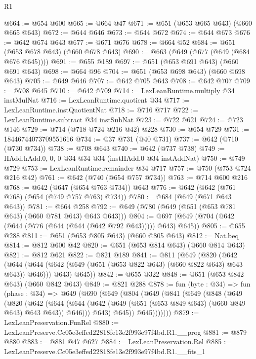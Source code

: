 \begin{lexlean}{R1}
\begin{coremodule}
@664 := @654 @600
@665 := @664 @47
@671 := @651 (@653 @665 @643) (@660 @665 @643)
@672 := @644 @646
@673 := @644 @672
@674 := @644 @673
@676 := @642 @674 @643
@677 := @671 @676
@678 := @664 @52
@684 := @651 (@653 @678 @643) (@660 @678 @643)
@690 := @663 (@649 (@677 (@649 (@684 @676 @645))))
@691 := @655 @189
@697 := @651 (@653 @691 @643) (@660 @691 @643)
@698 := @664 @96
@704 := @651 (@653 @698 @643) (@660 @698 @643)
@705 := @649 @646
@707 := @642 @705 @643
@708 := @642 @707
@709 := @708 @645
@710 := @642 @709
@714 := LexLeanRuntime.multiply @34 instMulNat
@716 := LexLeanRuntime.quotient @34
@717 := LexLeanRuntime.instQuotientNat
@718 := @716 @717
@722 := LexLeanRuntime.subtract @34 instSubNat
@723 := @722 @621
@724 := @723 @146
@729 := @714 (@718 @724 @216 @42) @228
@730 := @654 @729
@731 := 18446744073709551616
@734 := @37 @731 (@40 @731)
@737 := @642 (@710 (@730 @734))
@738 := @708 @643
@740 := @642 (@737 @738)
@749 := HAdd.hAdd.{0, 0, 0} @34 @34 @34 (instHAdd.{0} @34 instAddNat)
@750 := @749 @729
@753 := LexLeanRuntime.remainder @34 @717
@757 := @750 (@753 @724 @216 @42)
@761 := @642 (@740 (@654 @757 @734))
@763 := @714 @600 @216
@768 := @642 (@647 (@654 @763 @734)) @643
@776 := @642 (@642 (@761 @768) (@654 (@749 @757 @763) @734))
@780 := @684 (@649 (@671 @643 @643))
@781 := @664 @258
@792 := @649 (@780 (@649 (@651 (@653 @781 @643) (@660 @781 @643) @643 @643)))
@804 := @697 (@649 (@704 (@642 (@644 (@776 (@644 (@644 (@642 @792 @643))))) @643) @645))
@805 := @655 @288
@811 := @651 (@653 @805 @643) (@660 @805 @643)
@812 := Nat.beq
@814 := @812 @600 @42
@820 := @651 (@653 @814 @643) (@660 @814 @643)
@821 := @812 @621
@822 := @821 @189
@841 := @811
    (@649
      (@820
        (@642
          (@644 (@644 (@642 (@649 (@651 (@653 @822 @643) (@660 @822 @643) @643 @643)) @646)))
          @643)
        @645))
@842 := @655 @322
@848 := @651 (@653 @842 @643) (@660 @842 @643)
@849 := @821 @288
@878 := fun (byte : @34) =>
  fun (phase : @34) =>
  @649
    (@690
      (@649
        (@804
          (@649
            (@841
              (@649
                (@848
                  (@649
                    (@820
                      (@642
                        (@644
                          (@644
                            (@642 (@649 (@651 (@653 @849 @643) (@660 @849 @643) @643 @643)) @646)))
                        @643)
                      @645))
                  @645)))))))
@879 := LexLeanPreservation.FunRel
@880 := LexLeanPreserve.Cc05e3effed22818fe13e2f993e97f4bd.R1.__prog
@881 := @879 @880
@883 := @881 @47 @627
@884 := LexLeanPreservation.Rel
@885 := LexLeanPreserve.Cc05e3effed22818fe13e2f993e97f4bd.R1.__fits_1

\end{coremodule}
\end{lexlean}
